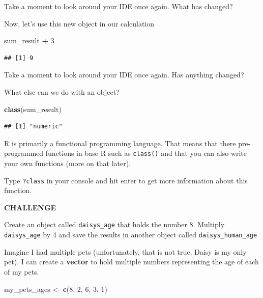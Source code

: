 \documentclass[
]{book}
\newenvironment{Shaded}{\begin{snugshade}}{\end{snugshade}}
\newcommand{\DecValTok}[1]{\textcolor[rgb]{0.00,0.00,0.81}{#1}}
\newcommand{\KeywordTok}[1]{\textcolor[rgb]{0.13,0.29,0.53}{\textbf{#1}}}
\newcommand{\NormalTok}[1]{#1}
\newcommand{\OperatorTok}[1]{\textcolor[rgb]{0.81,0.36,0.00}{\textbf{#1}}}
\newcommand{\StringTok}[1]{\textcolor[rgb]{0.31,0.60,0.02}{#1}}
\begin{document}
Take a moment to look around your IDE once again. What has changed?

Now, let's use this new object in our calculation

\begin{Shaded}
\begin{Highlighting}[]
\NormalTok{sum_result }\OperatorTok{+}\StringTok{ }\DecValTok{3}
\end{Highlighting}
\end{Shaded}

\begin{verbatim}
## [1] 9
\end{verbatim}

Take a moment to look around your IDE once again. Has anything changed?

What else can we do with an object?

\begin{Shaded}
\begin{Highlighting}[]
\KeywordTok{class}\NormalTok{(sum_result)}
\end{Highlighting}
\end{Shaded}

\begin{verbatim}
## [1] "numeric"
\end{verbatim}

R is primarily a functional programming language. That means that there pre-programmed functions in base R such as \texttt{class()} and that you can also write your own functions (more on that later).

Type \texttt{?class} in your console and hit enter to get more information about this function.

\textbf{CHALLENGE}

Create an object called \texttt{daisys\_age} that holds the number 8.
Multiply \texttt{daisys\_age} by 4 and save the results in another object called \texttt{daisys\_human\_age}

Imagine I had multiple pets (unfortunately, that is not true, Daisy is my only pet). I can create a \textbf{vector} to hold multiple numbers representing the age of each of my pets.

\begin{Shaded}
\begin{Highlighting}[]
\NormalTok{my_pets_ages <-}\StringTok{ }\KeywordTok{c}\NormalTok{(}\DecValTok{8}\NormalTok{, }\DecValTok{2}\NormalTok{, }\DecValTok{6}\NormalTok{, }\DecValTok{3}\NormalTok{, }\DecValTok{1}\NormalTok{)}
\end{Highlighting}
\end{Shaded}
\end{document}
